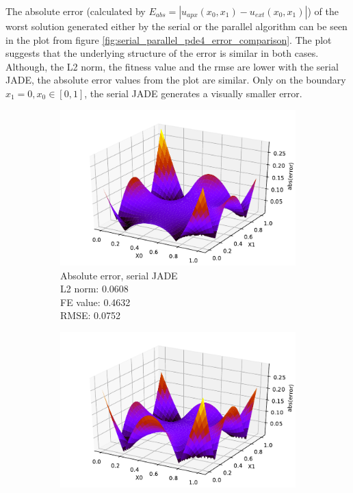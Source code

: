 \documentclass[./\jobname.tex]{subfiles}
\begin{document}
The absolute error (calculated by $E_{abs} = \left| u_{apx}(x_0, x_1) - u_{ext}(x_0, x_1) \right|$) of the worst solution generated either by the serial or the parallel algorithm can be seen in the plot from figure \ref{fig:serial_parallel_pde4_error_comparison}. The plot suggests that the underlying structure of the error is similar in both cases. Although, the L2 norm, the fitness value and the \gls{rmse} are lower with the serial JADE, the absolute error values from the plot are similar. Only on the boundary $x_1 = 0, x_0 \in [0,1]$, the serial JADE generates a visually smaller error. 

\begin{figure}[H]
	\centering
	\begin{subfigure}[b]{0.5\linewidth}
		\centering
		\includegraphics[width=1\textwidth]{../../code/experiments/experiment_1/abs_error_pde4_serial.pdf}
		\caption{Absolute error, serial JADE \\ L2 norm: 0.0608 \\ FE value: 0.4632 \\ RMSE: 0.0752}
		\label{fig:serial_JADE_pde4_abs_error}
	\end{subfigure}%
	\begin{subfigure}[b]{0.5\linewidth}
		\centering
		\includegraphics[width=1\textwidth]{../../code/experiments/experiment_1/abs_error_pde4_parallel.pdf}

\end{subfigure}
\end{figure}
\end{document}
